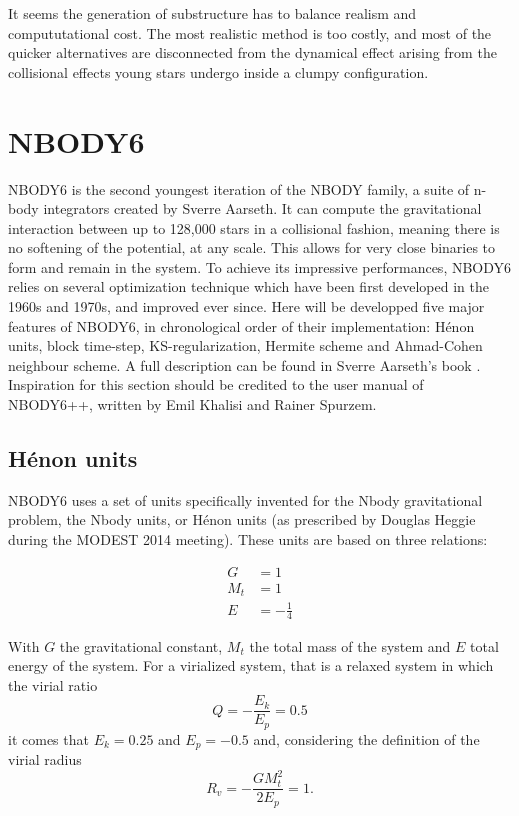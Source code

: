 It seems the generation of substructure has to balance realism and compututational cost. The most realistic method is too costly, and most of the quicker alternatives are disconnected from the dynamical effect arising from the collisional effects young stars undergo inside a clumpy configuration.











\newpage
\section{NBODY6}


NBODY6 is the second youngest iteration of the NBODY family, a suite of n-body integrators created by Sverre Aarseth. It can compute the gravitational interaction between up to 128,000 stars in a collisional fashion, meaning there is no softening of the potential, at any scale. This allows for very close binaries to form and remain in the system. To achieve its impressive performances, NBODY6 relies on several optimization technique which have been first developed in the 1960s and 1970s, and improved ever since. Here will be developped five major features of NBODY6, in chronological order of their implementation: H\'enon units, block time-step, KS-regularization, Hermite scheme and Ahmad-Cohen neighbour scheme. A full description can be found in Sverre Aarseth's book \citep{Aarseth2003}. Inspiration for this section should be credited to the user manual of NBODY6++, written by Emil Khalisi and Rainer Spurzem.

\subsection{H\'enon units}

NBODY6 uses a set of units specifically invented for the Nbody gravitational problem, the Nbody units, or H\'enon units (as prescribed by Douglas Heggie during the MODEST 2014 meeting). These units are based on three relations:

\begin{align}
G &= 1\\
M_t &= 1\\
E &= -\frac{1}{4}
\end{align}

With $G$ the gravitational constant, $M_t$ the total mass of the system and $E$ total energy of the system. For a virialized system, that is a relaxed system in which the virial ratio 
\begin{equation}
Q = - \frac{E_k}{E_p} = 0.5
\end{equation}
it comes that $E_k=0.25$ and $E_p = -0.5$ and, considering the definition of the virial radius 
\begin{equation}
R_v = - \frac{G M_t^2}{2 E_p} = 1.
\end{equation} 

